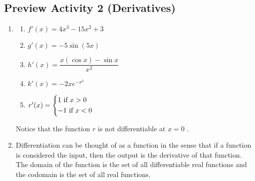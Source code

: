 \subsection*{Preview Activity 2 (Derivatives)}
\begin{enumerate}
\item \begin{multicols}{2}
\begin{enumerate}
\item $f'( x ) = 4x^3  - 15x^2  + 3$
\item $g'( x ) =  - 5\sin ( {5x} )$
\item $h'( x ) = \dfrac{{x( {\cos x} ) - \sin x}}{{x^2 }}$
\item $k'( x ) =  - 2xe^{ - x^2 } $
\item $r'( x ) = \left\{ \begin{gathered}  1\text{     if  }x > 0 \hfill \\   - 1\text{  if  }x < 0 \hfill \\ \end{gathered}  \right.$
\end{enumerate}
\end{multicols}
Notice that the function  $r$  is not differentiable at $x=0$  .

\item Differentiation can be thought of as a function in the sense that if a function is considered the input, then the output is the derivative of that function.  The domain of the function is the set of all differentiable real functions and the codomain is the set of all real functions.
\end{enumerate}
\hbreak



\endinput
